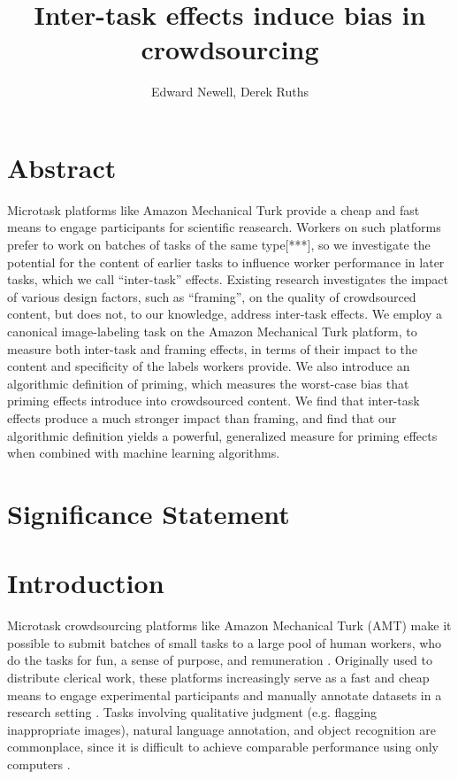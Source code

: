 \documentclass[a4paper]{report}
\title{Inter-task effects induce bias in crowdsourcing}
\author{Edward Newell, Derek Ruths}
\begin{document}
\maketitle
\section*{Abstract}
Microtask platforms like Amazon Mechanical Turk provide a cheap and fast means
to engage participants for scientific reasearch.  
Workers on such platforms prefer to work on batches of tasks of the same 
type[***], so we investigate the potential for the content of earlier tasks 
to influence worker performance in later tasks, which we call ``inter-task'' 
effects.  
Existing research investigates the impact of various design factors, such as 
``framing'', on the quality of crowdsourced content, but does not, to 
our knowledge, address inter-task effects.  
We employ a canonical image-labeling task on the Amazon Mechanical Turk 
platform, to measure both inter-task and framing effects, in terms of their 
impact to the content and specificity of the labels workers provide.
We also introduce an algorithmic definition of priming, which measures the 
worst-case bias that priming effects introduce into crowdsourced content.
We find that inter-task effects produce a much stronger impact than framing, 
and find that our algorithmic definition yields a powerful, generalized measure
for priming effects when combined with machine learning algorithms.


\section*{Significance Statement}
\section*{Introduction}

Microtask crowdsourcing platforms like Amazon Mechanical Turk (AMT) make it 
possible to submit batches of small tasks to a large pool of human workers, 
who do the tasks for fun, a sense of purpose, and remuneration 
\cite{kazai2013analysis, Antin20122925}.  
Originally used to distribute clerical work, these platforms 
increasingly serve as a fast and cheap means to engage experimental 
participants and manually annotate datasets in a research 
setting \cite{snow2008cheap}.  
Tasks involving qualitative
judgment (e.g. flagging inappropriate images), natural language annotation,
and object recognition are commonplace, since it is difficult to achieve 
comparable performance using only computers \cite{yuen2011survey}.
\end{document}
